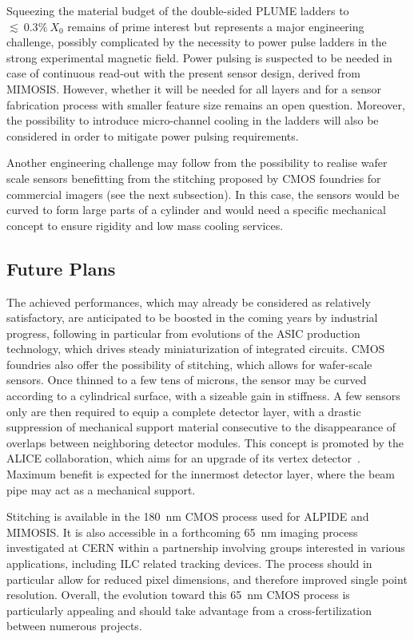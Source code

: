 Squeezing the material budget of the double-sided PLUME ladders to 
$\lesssim~0.3\%~X_0$ remains of prime interest but represents a major engineering challenge, possibly complicated by the necessity to 
power pulse ladders in the strong experimental magnetic field. 
Power pulsing is suspected to be needed in case of continuous 
read-out with the present sensor design, derived from MIMOSIS. 
However, whether it will be needed for all layers and for a sensor
fabrication process with smaller feature size remains an open 
question. Moreover, the possibility to introduce micro-channel 
cooling in the ladders will also be considered in order to mitigate 
power pulsing requirements.

Another engineering challenge may follow from the possibility 
to realise wafer scale sensors benefitting from the stitching
proposed by CMOS foundries for commercial imagers (see the next
subsection). In this case, the sensors would be curved to form 
large parts of a cylinder and would need a specific mechanical
concept to ensure rigidity and low mass cooling services.  

\subsection{Future Plans}
The achieved performances, which may already be considered as 
relatively satisfactory, are anticipated to be boosted in the 
coming years by industrial progress, following in particular 
from evolutions of the ASIC production technology, which drives 
steady miniaturization of integrated circuits. CMOS foundries 
also offer the possibility of stitching, which allows for 
wafer-scale sensors. Once thinned to a few tens of microns, 
the sensor may be curved according to a cylindrical surface, 
with a sizeable gain in stiffness. A few sensors only are then 
required to equip a complete detector layer, with a drastic 
suppression of mechanical support material consecutive to the 
disappearance of overlaps between neighboring detector modules. 
This concept is promoted by the ALICE collaboration, which aims 
for an upgrade of its vertex detector~\cite{CERN-LHCC-2019-018}. Maximum 
benefit is expected for the innermost detector layer, where the 
beam pipe may act as a mechanical support. 

  Stitching is available in the \SI{180}{\nano\meter} CMOS process used for 
ALPIDE and MIMOSIS. It is also accessible in a forthcoming 65~nm 
imaging process investigated at CERN within a partnership involving 
groups interested in various applications, including ILC related 
tracking devices. The process should in particular allow for 
reduced pixel dimensions, and therefore improved single point 
resolution. Overall, the evolution toward this \SI{65}{\nano\meter} CMOS process 
is particularly appealing and should take advantage from a 
cross-fertilization between numerous projects.

